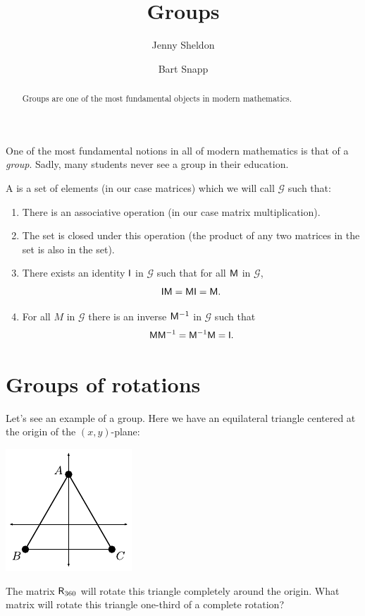 \documentclass{ximera}
\author{Jenny Sheldon \and Bart Snapp}
\title{Groups}
\begin{document}
\begin{abstract}
  Groups are one of the most fundamental objects in modern mathematics.
\end{abstract}
\maketitle

One of the most fundamental notions in all of modern mathematics is
that of a \textit{group}. Sadly, many students never see a group in their
education.

\begin{definition}
A  is a set of elements (in our case matrices) which we
will call $\mathcal{G}$ such that: 
\begin{enumerate}
\item There is an associative operation (in our case matrix multiplication).
\item The set is closed under this operation (the product of any two
  matrices in the set is also in the set).
\item There exists an identity $\mathsf{I}$ in $\mathcal{G}$ such that for all $\mathsf{M}$ in $\mathcal{G}$, 
\[
\mathsf{I}\mathsf{M}=\mathsf{M}\mathsf{I} = \mathsf{M}.
\]
\item For all $M$ in $\mathcal{G}$ there is an inverse $\mathsf{M}^{-1}$ in $\mathcal{G}$ such that 
\[
\mathsf{M} \mathsf{M}^{-1}= \mathsf{M}^{-1}\mathsf{M}= \mathsf{I}.
\]
\end{enumerate}
\end{definition}


\section{Groups of rotations}


Let's see an example of a group. Here we have an equilateral triangle centered at
the origin of the $(x,y)$-plane:
\begin{image}
\includegraphics{symTri.pdf}
\end{image}
\begin{question}
The matrix $\mathsf{R}_{360}$ will rotate this triangle completely
around the origin. What matrix will rotate this triangle one-third of
a complete rotation?
\end{question}
\end{document}
